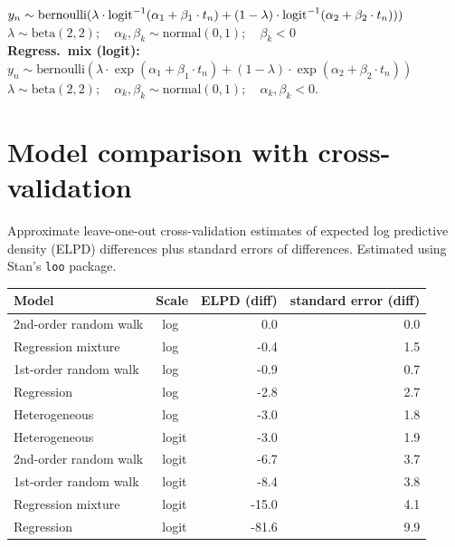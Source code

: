 \documentclass[plainboxedsections]{sciposter}
\begin{document}
\begin{multicols}{2}
$y_n \sim \textrm{bernoulli}(\lambda \cdot \textrm{logit}^{-1}(\alpha_1 + \beta_1 \cdot t_n) + (1 - \lambda) \cdot \textrm{logit}^{-1}(\alpha_2 + \beta_2 \cdot t_n)))$
\\[2pt]
\null\qquad\qquad\qquad\qquad $\lambda \sim \textrm{beta}(2, 2); 
\quad \alpha_k, \beta_k \sim \textrm{normal}(0, 1); 
\quad \beta_k < 0$
\\[12pt]
{\bfseries Regress.\ mix (logit):}
$y_n \sim \textrm{bernoulli}(\lambda \cdot \exp(\alpha_1 + \beta_1 \cdot t_n) + (1 - \lambda) \cdot \exp(\alpha_2 + \beta_2 \cdot t_n))$
\\[2pt]
\null\qquad\qquad\qquad\qquad $\lambda \sim \textrm{beta}(2, 2); 
\quad \alpha_k, \beta_k \sim \textrm{normal}(0, 1); 
\quad \alpha_k, \beta_k < 0.$



\section{Model comparison with cross-validation}

Approximate leave-one-out cross-validation estimates of expected log
predictive density (ELPD) differences plus standard
errors of differences.  Estimated using Stan's \texttt{loo} package.
\vspace*{12pt}
\begin{center}
\renewcommand{\arraystretch}{1.4}
\begin{tabular}{ll|rr}
\hline
Model & Scale & ELPD (diff) & standard error (diff)
\\ \hline
2nd-order random walk & \ log &  0.0 & 0.0
\\
Regression mixture & \ log &   -0.4 &      1.5  
\\
1st-order random walk & \ log        &         -0.9 &       0.7  
\\
Regression & \ log &   -2.8  &     2.7  
\\
Heterogeneous & \ log & -3.0     &  1.8  
\\ \hline
Heterogeneous & \ logit &    -3.0    &   1.9  
\\
2nd-order random walk & \ logit  & -6.7     &  3.7  
\\
1st-order random walk & \ logit              & -8.4      & 3.8  
\\
Regression mixture & \ logit  & -15.0  &     4.1  
\\
Regression & \ logit & -81.6   &    9.9
\\ \hline
\end{tabular}


\end{center}
\end{multicols}
\end{document}
